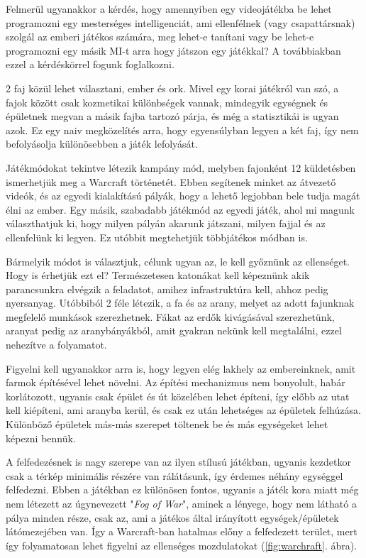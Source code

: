 Felmerül ugyanakkor a kérdés, hogy amennyiben egy videojátékba be lehet programozni egy mesterséges intelligenciát, ami ellenfélnek (vagy csapattársnak) szolgál az emberi játékos számára, meg lehet-e tanítani vagy be lehet-e programozni egy másik MI-t arra hogy játszon egy játékkal? A továbbiakban ezzel a kérdéskörrel fogunk foglalkozni.


2 faj közül lehet választani, ember és ork. Mivel egy korai játékról van szó, a fajok között csak kozmetikai különbségek vannak, mindegyik egységnek és épületnek megvan a másik fajba tartozó párja, és még a statisztikái is ugyan azok. Ez egy naiv megközelítés arra, hogy egyensúlyban legyen a két faj, így nem befolyásolja különösebben a játék lefolyását.

Játékmódokat tekintve létezik kampány mód, melyben fajonként 12 küldetésben ismerhetjük meg a Warcraft történetét. Ebben segítenek minket az átvezető videók, és az egyedi kialakítású pályák, hogy a lehető legjobban bele tudja magát élni az ember.
Egy másik, szabadabb játékmód az egyedi játék, ahol mi magunk választhatjuk ki, hogy milyen pályán akarunk játszani, milyen fajjal és az ellenfelünk ki legyen. Ez utóbbit megtehetjük többjátékos módban is.

Bármelyik módot is választjuk, célunk ugyan az, le kell győznünk az ellenséget. Hogy is érhetjük ezt el? Természetesen katonákat kell képeznünk akik parancsunkra elvégzik a feladatot, amihez infrastruktúra kell, ahhoz pedig nyersanyag. Utóbbiból 2 féle létezik, a fa és az arany, melyet az adott fajunknak megfelelő munkások szerezhetnek. Fákat az erdők kivágásával szerezhetünk, aranyat pedig az aranybányákból, amit gyakran nekünk kell megtalálni, ezzel nehezítve a folyamatot. 

Figyelni kell ugyanakkor arra is, hogy legyen elég lakhely az embereinknek, amit farmok építésével lehet növelni. Az építési mechanizmus nem bonyolult, habár korlátozott, ugyanis csak épület és út közelében lehet építeni, így előbb az utat kell kiépíteni, ami aranyba kerül, és csak ez után lehetséges az épületek felhúzása. Különböző épületek más-más szerepet töltenek be és más egységeket lehet képezni bennük. 

A felfedezésnek is nagy szerepe van az ilyen stílusú játékban, ugyanis kezdetkor csak a térkép minimális részére van rálátásunk, így érdemes néhány egységgel felfedezni. Ebben a játékban ez különösen fontos, ugyanis a játék kora miatt még nem létezett az úgynevezett "\textit{Fog of War}", aminek a lényege, hogy nem látható a pálya minden része, csak az, ami a játékos által irányított egységek/épületek látómezejében van. Így a Warcraft-ban hatalmas előny a felfedezett terület, mert így folyamatosan lehet figyelni az ellenséges mozdulatokat (\ref{fig:warchraft}. ábra).

